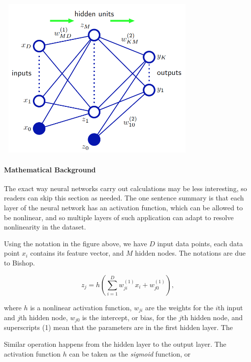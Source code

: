 \documentclass[]{article}
\newenvironment{Figure}
  {\par\medskip\noindent\minipage{\linewidth}}
  {\endminipage\par\medskip}
\begin{document}
\begin{Figure}
 \centering
 \includegraphics[height = 8cm, width =10cm]{neuralnet.png}
\end{Figure}

\paragraph{Mathematical Background}
The exact way neural networks carry out calculations may be less interesting, so readers can skip this section as needed. The one sentence summary is that each layer of the neural network has an activation function, which can be allowed to be nonlinear, and so multiple layers of such application can adapt to resolve nonlinearity in the dataset.%

Using the notation in the figure above, we have $D$ input data points, each data point $x_i$ contains its feature vector, and $M$ hidden nodes. The notations are due to Bishop\cite{bishop}.

\begin{equation*}
z_j = h(\sum_{i=1}^D{w_{ji}^{(1)}x_i + w_{j0}^{(1)}}),
\end{equation*}

where $h$ is a nonlinear activation function, $w_{ji}$ are the weights for the $i$th input and $j$th hidden node,  $w_{j0}$ is the intercept, or bias, for the $j$th hidden node, and superscripts (1) mean that the parameters are in the first hidden layer. The 

Similar operation happens from the hidden layer to the output layer. The activation function $h$ can be taken as the \textit{sigmoid} function, or
\end{document}
